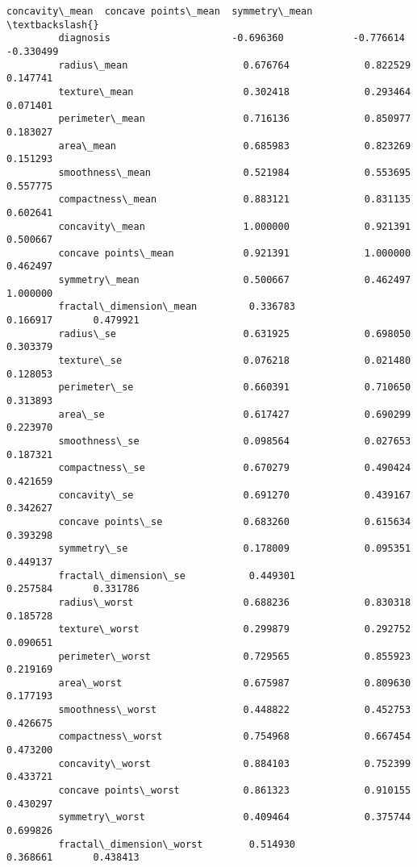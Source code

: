 \documentclass[11pt]{article}
\begin{document}
\begin{Verbatim}[commandchars=\\\{\}]
                                  concavity\_mean  concave points\_mean  symmetry\_mean  \textbackslash{}
         diagnosis                     -0.696360            -0.776614      -0.330499   
         radius\_mean                    0.676764             0.822529       0.147741   
         texture\_mean                   0.302418             0.293464       0.071401   
         perimeter\_mean                 0.716136             0.850977       0.183027   
         area\_mean                      0.685983             0.823269       0.151293   
         smoothness\_mean                0.521984             0.553695       0.557775   
         compactness\_mean               0.883121             0.831135       0.602641   
         concavity\_mean                 1.000000             0.921391       0.500667   
         concave points\_mean            0.921391             1.000000       0.462497   
         symmetry\_mean                  0.500667             0.462497       1.000000   
         fractal\_dimension\_mean         0.336783             0.166917       0.479921   
         radius\_se                      0.631925             0.698050       0.303379   
         texture\_se                     0.076218             0.021480       0.128053   
         perimeter\_se                   0.660391             0.710650       0.313893   
         area\_se                        0.617427             0.690299       0.223970   
         smoothness\_se                  0.098564             0.027653       0.187321   
         compactness\_se                 0.670279             0.490424       0.421659   
         concavity\_se                   0.691270             0.439167       0.342627   
         concave points\_se              0.683260             0.615634       0.393298   
         symmetry\_se                    0.178009             0.095351       0.449137   
         fractal\_dimension\_se           0.449301             0.257584       0.331786   
         radius\_worst                   0.688236             0.830318       0.185728   
         texture\_worst                  0.299879             0.292752       0.090651   
         perimeter\_worst                0.729565             0.855923       0.219169   
         area\_worst                     0.675987             0.809630       0.177193   
         smoothness\_worst               0.448822             0.452753       0.426675   
         compactness\_worst              0.754968             0.667454       0.473200   
         concavity\_worst                0.884103             0.752399       0.433721   
         concave points\_worst           0.861323             0.910155       0.430297   
         symmetry\_worst                 0.409464             0.375744       0.699826   
         fractal\_dimension\_worst        0.514930             0.368661       0.438413   
         

\end{Verbatim}
\end{document}
